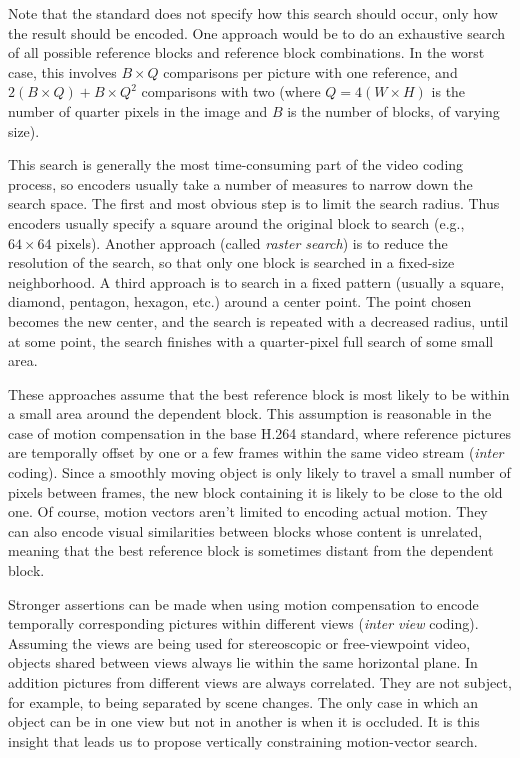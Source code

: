 \documentclass{sig-alternate-05-2015}
\begin{document}
Note that the standard does not specify how this search should occur, only
how the result should be encoded. One approach would be to do an exhaustive
search of all possible reference blocks and reference block combinations. In
the worst case, this involves $B \times Q$ comparisons per picture with one
reference, and $2(B \times Q) + B \times Q^2$ comparisons with two (where
$Q = 4(W\times H)$ is the number of quarter pixels in the image and $B$ is
the number of blocks, of varying size).

This search is generally the most time-consuming part of the video coding
process, so encoders usually take a number of measures to narrow down the
search space. The first and most obvious step is to limit the search radius.
Thus encoders usually specify a square around the original block to search
(e.g., $64\times 64$ pixels). Another approach (called {\it raster search})
is to reduce the resolution of the search, so that only one block is searched
in a fixed-size neighborhood. A third approach is to search in a fixed
pattern (usually a square, diamond, pentagon, hexagon, etc.) around a center
point. The point chosen becomes the new center, and the search is repeated
with a decreased radius, until at some point, the search finishes with a
quarter-pixel full search of some small area.

These approaches assume that the best reference block is most likely to be
within a small area around the dependent block. This assumption is reasonable
in the case of motion compensation in the base H.264 standard, where reference
pictures are temporally offset by one or a few frames within the same video
stream ({\it inter} coding). Since a smoothly moving object is only likely to
travel a small number of pixels between frames, the new block containing it is
likely to be close to the old one. Of course, motion vectors aren't limited to
encoding actual motion. They can also encode visual similarities between blocks
whose content is unrelated, meaning that the best reference block is sometimes
distant from the dependent block.

Stronger assertions can be made when using motion compensation to encode
temporally corresponding pictures within different views ({\it inter view}
coding). Assuming the views are being used for stereoscopic or free-viewpoint
video, objects shared between views always lie within the same horizontal plane.
In addition pictures from different views are always correlated. They are not
subject, for example, to being separated by scene changes. The only case in
which an object can be in one view but not in another is when it is occluded. It
is this insight that leads us to propose vertically constraining motion-vector
search.
\end{document}

